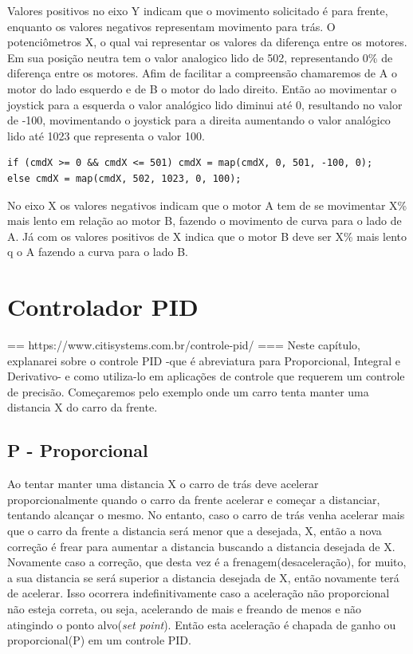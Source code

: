 \documentclass[a4paper,12pt,portuguese]{ufms-cpcx}
\begin{document}
Valores positivos no eixo Y indicam que o movimento solicitado é para frente, enquanto os valores negativos representam movimento para trás.
O potenciômetros X, o qual vai representar os valores da diferença entre os motores. Em sua posição neutra tem o valor analogico lido de 502, representando 0\% de diferença entre os motores. Afim de facilitar a compreensão chamaremos de A o motor do lado esquerdo e de B o motor do lado direito. Então ao movimentar o joystick para a esquerda o valor analógico lido diminui até 0, resultando no valor de -100, movimentando o joystick para a direita aumentando o valor analógico lido até 1023 que representa o valor 100. 
\begin{lstlisting}
if (cmdX >= 0 && cmdX <= 501) cmdX = map(cmdX, 0, 501, -100, 0);
else cmdX = map(cmdX, 502, 1023, 0, 100);
\end{lstlisting}
No eixo X os valores negativos indicam que o motor A tem de se movimentar X\% mais lento em relação ao motor B, fazendo o movimento de curva para o lado de A. Já com os valores positivos de X indica que o motor B deve ser X\% mais lento q o A fazendo a curva para o lado B.

\chapter{Controlador PID}\label{pid}
== https://www.citisystems.com.br/controle-pid/ ===
Neste capítulo, explanarei sobre o controle PID -que é abreviatura para Proporcional, Integral e Derivativo- e como utiliza-lo em aplicações de controle que requerem um controle de precisão. Começaremos pelo exemplo onde um carro tenta manter uma distancia X do carro da frente.

\section{P - Proporcional}
Ao tentar manter uma distancia X o carro de trás deve acelerar proporcionalmente quando o carro da frente acelerar e começar a distanciar, tentando alcançar o mesmo. No entanto, caso o carro de trás venha acelerar mais que o carro da frente a distancia será menor que a desejada, X, então a nova correção é frear para aumentar a distancia buscando a distancia desejada de X. Novamente caso a correção, que desta vez é a frenagem(desaceleração), for muito, a sua distancia se será superior a distancia desejada de X, então novamente terá de acelerar. Isso ocorrera indefinitivamente caso a aceleração não proporcional não esteja correta, ou seja, acelerando de mais e freando de menos e não atingindo o ponto alvo(\textit{set point}). Então esta aceleração é chapada de ganho ou proporcional(P) em um controle PID.
\end{document}

